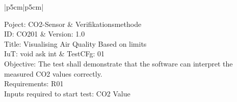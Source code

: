 \label{Testing}

\begin{table}[!hbt]
	
	\centering
	
	\begin{tabular}{|p{5cm}|p{5cm}|}
		
		\hline
		Poject: CO2-Sensor & Verifikationsmethode \\
		\hline
		ID: CO201 & Version: 1.0 \\
		\hline
		 {Title: Visualising Air Quality Based on limits} \\
		\hline
		IuT: void ask int & TestCFg: 01 \\
		\hline
		 {Objective: The test shall demonstrate that the software can interpret the measured CO2 values correctly.} \\
		\hline
		 {Requirements: R01} \\
		\hline
		 {Inputs required to start test: CO2 Value} \\
		\hline
			
	\end{tabular}

\label{tab:Test_1}

\end{table}